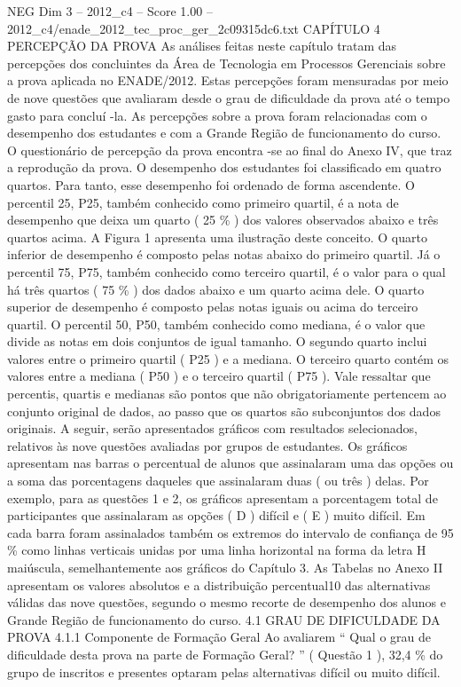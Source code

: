\begin{textsample}{NEG Dim 3 – 2012\_c4 – Score 1.00 – 2012\_c4/enade\_2012\_tec\_proc\_ger\_2c09315dc6.txt}  \label{ex:f3_neg_131}
CAPÍTULO 4 PERCEPÇÃO DA PROVA As análises feitas neste capítulo tratam das percepções dos concluintes da Área de Tecnologia em Processos Gerenciais sobre a prova aplicada no ENADE/2012.
Estas percepções foram mensuradas por meio de nove questões que avaliaram desde o grau de dificuldade da prova até o tempo gasto para concluí -la.
As percepções sobre a prova foram relacionadas com o desempenho dos estudantes e com a Grande Região de funcionamento do curso.
O questionário de percepção da prova encontra -se ao final do Anexo IV, que traz a reprodução da prova.
O desempenho dos estudantes foi classificado em quatro quartos.
Para tanto, esse desempenho foi ordenado de forma ascendente.
O percentil 25, P25, também conhecido como primeiro quartil, é a nota de desempenho que deixa um quarto ( 25 \% ) dos valores observados abaixo e três quartos acima.
A Figura 1 apresenta uma ilustração deste conceito.
O quarto inferior de desempenho é composto pelas notas abaixo do primeiro quartil.
Já o percentil 75, P75, também conhecido como terceiro quartil, é o valor para o qual há três quartos ( 75 \% ) dos dados abaixo e um quarto acima dele.
O quarto superior de desempenho é composto pelas notas iguais ou acima do terceiro quartil.
O percentil 50, P50, também conhecido como mediana, é o valor que divide as notas em dois conjuntos de igual tamanho.
O segundo quarto inclui valores entre o primeiro quartil ( P25 ) e a mediana.
O terceiro quarto contém os valores entre a mediana ( P50 ) e o terceiro quartil ( P75 ).
Vale ressaltar que percentis, quartis e medianas são pontos que não obrigatoriamente pertencem ao conjunto original de dados, ao passo que os quartos são subconjuntos dos dados originais.
A seguir, serão apresentados gráficos com resultados selecionados, relativos às nove questões avaliadas por grupos de estudantes.
Os gráficos apresentam nas barras o percentual de alunos que assinalaram uma das opções ou a soma das porcentagens daqueles que assinalaram duas ( ou três ) delas.
Por exemplo, para as questões 1 e 2, os gráficos apresentam a porcentagem total de participantes que assinalaram as opções ( D ) difícil e ( E ) muito difícil.
Em cada barra foram assinalados também os extremos do intervalo de confiança de 95 \% como linhas verticais unidas por uma linha horizontal na forma da letra H maiúscula, semelhantemente aos gráficos do Capítulo 3.
As Tabelas no Anexo II apresentam os valores absolutos e a distribuição percentual10 das alternativas válidas das nove questões, segundo o mesmo recorte de desempenho dos alunos e Grande Região de funcionamento do curso. 4.1 GRAU DE DIFICULDADE DA PROVA 4.1.1 Componente de Formação Geral Ao avaliarem “ Qual o grau de dificuldade desta prova na parte de Formação Geral? ” ( Questão 1 ), 32,4 \% do grupo de inscritos e presentes optaram pelas alternativas difícil ou muito difícil.

\end{textsample}
